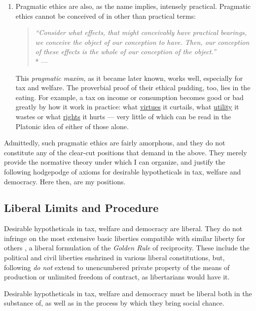 \begin{description}
\begin{enumerate}
		\item 
		Pragmatic ethics are also, as the name implies, intensely practical. Pragmatic ethics cannot be conceived of in other than practical terms: 
		\begin{quote}
			\emph{``Consider what effects, that might conceivably have practical bearings, we conceive the object of our conception to have. Then, our conception of these effects is the whole of our conception of the object.''} \\*
			--- \citet[293]{Peirce1878}
		\end{quote}
		This \emph{pragmatic maxim}, as it became later known, works well, especially for tax and welfare. 
		The proverbial proof of their ethical pudding, too, lies in the eating. 
		For example, a tax on income or consumption becomes good or bad greatly by how it work in practice: what \hyperref[itm:virtue]{virtues} it curtails, what \hyperref[itm:consequentialism]{utility} it wastes or what \hyperref[itm:deontological]{rights} it hurts --- very little of which can be read in the Platonic idea of either of those alone.
	\end{enumerate}		
\end{description}

Admittedly, such pragmatic ethics are fairly amorphous, and they do not constitute any of the clear-cut positions that \citeauthor{Zizek2003} demand in the above. 
They merely provide the normative theory under which I can organize, and justify the following hodgepodge of axioms for desirable hypotheticals in tax, welfare and democracy. 
Here then, are my positions.

\subsection[Liberal]{Liberal Limits and Procedure} \label{sec:liberal}
Desirable hypotheticals in tax, welfare and democracy are liberal. 
They do not infringe on the most extensive basic liberties compatible with similar liberty for others \citep{Rawls-1971-aa}, a liberal formulation of the \emph{Golden Rule} of reciprocity. 
These include the political and civil liberties enshrined in various liberal constitutions, but, following \citeauthor{Rawls-1971-aa} \emph{do not} extend to unencumbered private property of the means of production or unlimited freedom of contract, as libertarians would have it.

Desirable hypotheticals in tax, welfare and democracy must be liberal both in the substance of, as well as in the process by which they bring social chance. 

